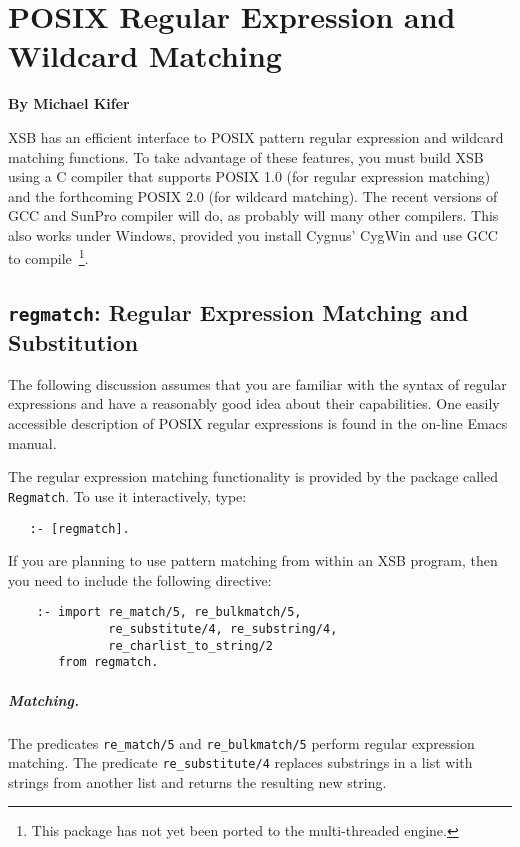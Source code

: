 \chapter{POSIX Regular Expression and Wildcard Matching}
\label{chap-posix}

\begin{center}
{\Large {\bf By Michael Kifer}}
\end{center}

XSB has an efficient interface to POSIX pattern regular expression and
wildcard matching functions.  To take advantage of these features, you
must build XSB using a C compiler that supports POSIX 1.0 (for regular
expression matching) and the forthcoming POSIX 2.0 (for wildcard
matching).  The recent versions of GCC and SunPro compiler will do, as
probably will many other compilers. This also works under Windows,
provided you install Cygnus' CygWin and use GCC to
compile~\footnote{This package has not yet been ported to the
  multi-threaded engine.}.

\section{{\tt regmatch}: Regular Expression Matching and Substitution}

The following discussion assumes that you are familiar with the syntax of
regular expressions and have a reasonably good idea about their
capabilities. One easily accessible description of POSIX regular
expressions is found in the on-line Emacs manual.

The regular expression matching functionality is provided by the package
called {\tt Regmatch}. To use it interactively, type:
\begin{verbatim}
   :- [regmatch].
\end{verbatim}

If you are planning to use pattern matching from within an XSB program,
then you need to include the following directive:
\begin{verbatim}
    :- import re_match/5, re_bulkmatch/5,
              re_substitute/4, re_substring/4,
              re_charlist_to_string/2
       from regmatch.
\end{verbatim}

\paragraph{Matching.}
The predicates \verb|re_match/5| and \verb|re_bulkmatch/5| perform regular
expression matching.  The predicate \verb|re_substitute/4| replaces
substrings in a list with strings from another list and returns the
resulting new string.

